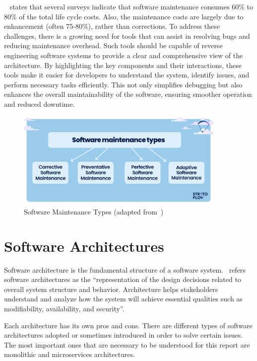 ~\citep{SeMaintainance2001} states that several surveys indicate that software maintenance consumes 60\% to 80\% of the total life cycle costs. Also, the maintenance costs are largely due to enhancement (often 75{-}80\%), rather than corrections. To address these challenges, there is a growing need for tools that can assist in resolving bugs and reducing maintenance overhead. Such tools should be capable of reverse engineering software systems to provide a clear and comprehensive view of the architecture. By highlighting the key components and their interactions, these tools make it easier for developers to understand the system, identify issues, and perform necessary tasks efficiently. This not only simplifies debugging but also enhances the overall maintainability of the software, ensuring smoother operation and reduced downtime.

\begin{figure}[H]
    \centering
    \includegraphics[width=0.9\textwidth]{figures/se_maintenance.png}
    \caption[Software Maintenance Types]{Software Maintenance Types (adapted from~\cite{stratoflow2025})}
	\label{fig_se_maintenance}
\end{figure}

\section{Software Architectures}
Software architecture is the fundamental structure of a software system.~\citep{sei_software_architecture} refers software architectures as the ``representation of the design decisions related to overall system structure and behavior. Architecture helps stakeholders understand and analyze how the system will achieve essential qualities such as modifiability, availability, and security''.

Each architecture has its own pros and cons. There are different types of software architectures adopted or sometimes introduced in order to solve certain issues. The most important ones that are necessary to be understood for this report are monolithic and microservices architectures.

